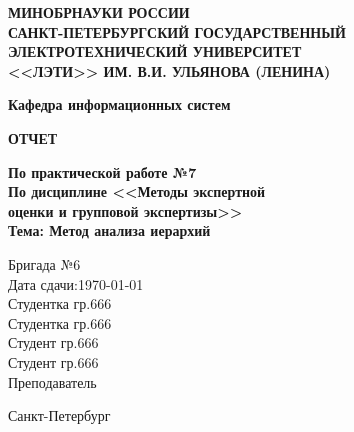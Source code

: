 \documentclass[../main]{subfiles}
\begin{document}
\begin{titlepage}
    \begin{large}
        \centering
        
        \MakeUppercase{\bfseries
            минобрнауки россии\\
            санкт-петербургский государственный\\
            электротехнический университет\\
            <<лэти>> им. в.и. ульянова (ленина)
        }
        
        {\bfseries
            Кафедра информационных систем
        }
        
        \vfill
        
        \MakeUppercase{\bfseries
            отчет
        }

        {\bfseries
            По практической работе №7\\
            По дисциплине <<Методы экспертной \\ оценки и групповой экспертизы>>\\
            Тема: Метод анализа иерархий
        }

        \vfill
        
        {\normalsize
            Бригада №6\\Дата сдачи:\today\\
            \vfill
            Студентка гр.666\hfill\underline{\hspace{5cm}}\\
            Студентка гр.666\hfill\underline{\hspace{5cm}}\\
            Студент гр.666\hfill\underline{\hspace{5cm}}\\
            Студент гр.666\hfill\underline{\hspace{5cm}}\\
            Преподаватель\hfill \underline{\hspace{5cm}}\makebox[0.5cm]{}\\
        }

        \vspace{1cm}

        {\normalsize
            Санкт-Петербург\\
            \the\year
        }
        
    \end{large}
\end{titlepage}

\setcounter{page}{2}
\end{document}
